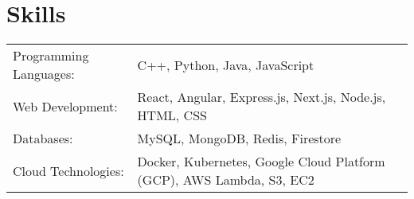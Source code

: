 \documentclass[a4paper,12pt]{article}
\begin{document}
\section{Skills}
\begin{tabularx}{\linewidth}{@{}l X@{}}
Programming Languages: & \normalsize{C++, Python, Java, JavaScript} \\
Web Development: & \normalsize{React, Angular, Express.js, Next.js, Node.js, HTML, CSS} \\
Databases: & \normalsize{MySQL, MongoDB, Redis, Firestore} \\
Cloud Technologies: & \normalsize{Docker, Kubernetes, Google Cloud Platform (GCP), AWS Lambda, S3, EC2} \\
\end{tabularx}

\vfill
{}
\end{document}
